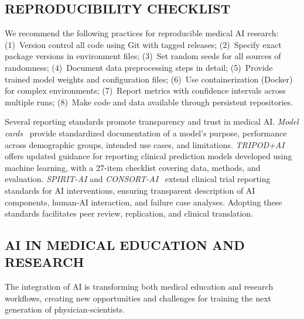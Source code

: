 \documentclass[krantz2,ChapterTOCs]{krantz}
\begin{document}
\subsection{REPRODUCIBILITY CHECKLIST}

We recommend the following practices for reproducible medical AI research:
(1)~Version control all code using Git with tagged releases;
(2)~Specify exact package versions in environment files;
(3)~Set random seeds for all sources of randomness;
(4)~Document data preprocessing steps in detail;
(5)~Provide trained model weights and configuration files;
(6)~Use containerization (Docker) for complex environments;
(7)~Report metrics with confidence intervals across multiple runs;
(8)~Make code and data available through persistent repositories.

Several reporting standards promote transparency and trust in medical AI.
\emph{Model cards}~\citep{mitchell2019modelcards} provide standardized documentation of a model's purpose, performance across demographic groups, intended use cases, and limitations.
\emph{TRIPOD+AI}~\citep{collins2024tripodai} offers updated guidance for reporting clinical prediction models developed using machine learning, with a 27-item checklist covering data, methods, and evaluation.
\emph{SPIRIT-AI} and \emph{CONSORT-AI}~\citep{liu2020consortai} extend clinical trial reporting standards for AI interventions, ensuring transparent description of AI components, human-AI interaction, and failure case analyses.
Adopting these standards facilitates peer review, replication, and clinical translation.

\subsection{AI IN MEDICAL EDUCATION AND RESEARCH}

The integration of AI is transforming both medical education and research workflows, creating new opportunities and challenges for training the next generation of physician-scientists.
\end{document}
